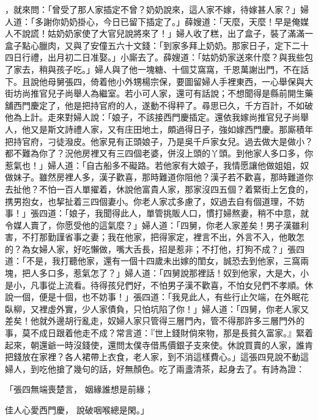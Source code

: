 \begin{showcontents}{}
，就來問：「曾受了那人家插定不曾？奶奶說來，這人家不嫁，待嫁甚人家？」婦人道：「多謝你奶奶掛心，今日已留下插定了。」薛嫂道：「天麼，天麼！早是俺媒人不說謊！姑奶奶家使了大官兒說將來了！」婦人收了糕，出了盒子，裝了滿滿一盒子點心臘肉，又與了安僮五六十文錢：「到家多拜上奶奶。那家日子，定下二十四日行禮，出月初二日准娶。」小廝去了。薛嫂道：「姑奶奶家送來什麼？與我些包了家去，稍與孩子吃。」婦人與了他一塊糖、十個艾窩窩，千恩萬謝出門，不在話下。且說他母舅張四，倚着他小外甥楊宗保，要圖留婦人手裡東西，一心舉保與大街坊尚推官兒子尚舉人為繼室。若小可人家，還可有話說；不想聞得是縣前開生藥舖西門慶定了，他是把持官府的人，遂動不得秤了。尋思已久，千方百計，不如破他為上計。走來對婦人說：「娘子，不該接西門慶插定。還依我嫁尚推官兒子尚舉人，他又是斯文詩禮人家，又有庄田地土，頗過得日子，強如嫁西門慶。那廝積年把持官府，刁徒潑皮。他家見有正頭娘子，乃是吳千戶家女兒。過去做大是做小？都不難為你了？況他房裡又有三四個老婆，併沒上頭的丫頭。到他家人多口多，你惹氣也！」婦人道：「自古船多不礙路。若他家有大娘子，我情愿讓他做姐姐，奴做妹子。雖然房裡人多，漢子歡喜，那時難道你阻他？漢子若不歡喜，那時難道你去扯他？不怕一百人單擢着，休說他富貴人家，那家沒四五個？着緊街上乞食的，携男抱女，也挈扯着三四個妻小。你老人家忒多慮了，奴過去自有個道理，不妨事！」張四道：「娘子，我聞得此人，單管挑販人口，慣打婦熬妻，稍不中意，就令媒人賣了，你愿受他的這氣麼？」婦人道：「四舅，你老人家差矣！男子漢雖利害，不打那勤謹省事之妻；我在他家，把得家定，裡言不出，外言不入，他敢怎的？為女婦人家，好吃懶做，嘴大舌長，招是惹非；不打他，打狗不成？」張四道：「不是，我打聽他家，還有一個十四歲未出嫁的閨女，誠恐去到他家，三窩兩塊，把人多口多，惹氣怎了？」婦人道：「四舅說那裡話！奴到他家，大是大，小是小，凡事從上流看。待得孩兒們好，不怕男子漢不歡喜，不怕女兒們不孝順。休說一個，便是十個，也不妨事！」張四道：「我見此人，有些行止欠端，在外眠花臥柳，又裡虛外實，少人家債負，只怕坑陷了你！」婦人道：「四舅，你老人家又差矣！他就外邊胡行亂走，奴婦人家只管得三層門內，管不得那許多三層門外的事，莫不成日跟着他走不成？常言道：『世上錢財倘來物，那是長貧久富家。』緊着起來，朝還爺一時沒錢使，還問太僕寺借馬價銀子支來使。休說買賣的人家，誰肯把錢放在家裡？各人裙帶上衣食，老人家，到不消這樣費心。」這張四見說不動這婦人，到吃他搶了幾句的話，好無顏色。吃了兩盞清茶，起身去了。有詩為證：

「張四無端喪楚言，  姻緣誰想是前緣；

佳人心愛西門慶，  說破咽喉總是閑。」


\end{showcontents}
